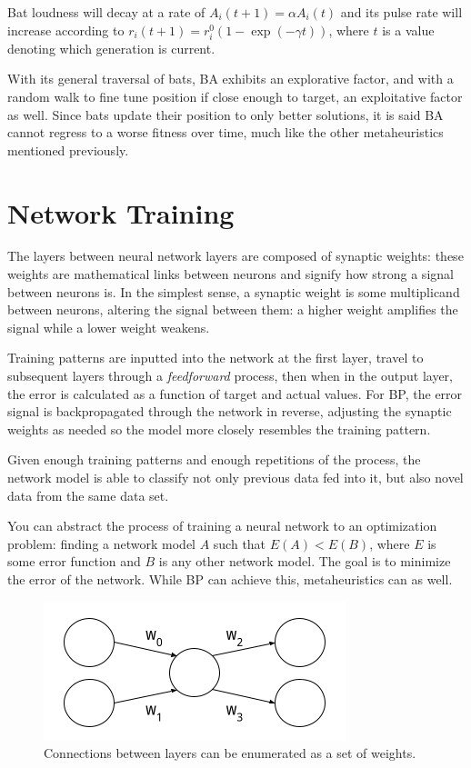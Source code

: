 \documentclass[a4paper,12pt]{article}
\begin{document}
\pagebreak

Bat loudness will decay at a rate of $A_i(t+1) = \alpha A_i(t)$ and its pulse rate will increase according to $r_i(t+1) = r_i^0 (1 - \exp{(-\gamma t)})$, where $t$ is a value denoting which generation is current.

With its general traversal of bats, BA exhibits an explorative factor, and with a random walk to fine tune position if close enough to target, an exploitative factor as well. Since bats update their position to only better solutions, it is said BA cannot regress to a worse fitness over time, much like the other metaheuristics mentioned previously.

\section{Network Training}

The layers between neural network layers are composed of synaptic weights: these weights are mathematical links between neurons and signify how strong a signal between neurons is. In the simplest sense, a synaptic weight is some multiplicand between neurons, altering the signal between them: a higher weight amplifies the signal while a lower weight weakens.

Training patterns are inputted into the network at the first layer, travel to subsequent layers through a \textit{feedforward} process, then when in the output layer, the error is calculated as a function of target and actual values. For BP, the error signal is backpropagated through the network in reverse, adjusting the synaptic weights as needed so the model more closely resembles the training pattern.

Given enough training patterns and enough repetitions of the process, the network model is able to classify not only previous data fed into it, but also novel data from the same data set.

You can abstract the process of training a neural network to an optimization problem: finding a network model $A$ such that $E(A) < E(B)$, where $E$ is some error function and $B$ is any other network model. The goal is to minimize the error of the network. While BP can achieve this, metaheuristics can as well.

\begin{figure}[h!]
\centering
\includegraphics[scale=0.65]{images/weight-visualization.png}
\caption{Connections between layers can be enumerated as a set of weights.}
\label{fig:weight-vis}
\end{figure}
\end{document}
